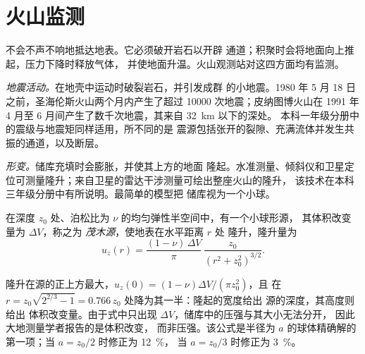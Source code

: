 \section{火山监测}

不会不声不响地抵达地表。它必须破开岩石以开辟
通道；积聚时会将地面向上推起，压力下降时释放气体，
并使地面升温。火山观测站对这四方面均有监测。

\emph{地震活动。}在地壳中运动时破裂岩石，并引发成群
的小地震。1980 年 5 月 18 日之前，圣海伦斯火山两个月内产生了超过
\num{10000} 次地震；皮纳图博火山在 1991 年 4 月至
6 月间产生了数千次地震，其来自 \qty{32}{km} 以下的深处。
本科一年级分册中的震级与地震矩同样适用，所不同的是
震源包括张开的裂隙、充满流体并发生共振的通道，以及断层。

\emph{形变。}储库充填时会膨胀，并使其上方的地面
隆起。水准测量、倾斜仪和卫星定位可测量隆升；来自卫星的雷达干涉测量可绘出整座火山的隆升，
该技术在本科三年级分册中有所说明。最简单的模型把
储库视为一个小球。

\begin{proposition}[茂木源]\label{prop:b2:eruptive-styles:mogi}
在深度 $z_0$ 处、泊松比为 $\nu$ 的均匀弹性半空间中，有一个小球形源，
其体积改变量为 $\Delta V$，称之为
\emph{茂木源}，使地表在水平距离 $r$ 处
隆升，隆升量为
\[
u_z(r) = \frac{(1 - \nu)\,\Delta V}{\pi}\,\frac{z_0}{(r^2 + z_0^2)^{3/2}} .
\]
\end{proposition}
\admitted

隆升在源的正上方最大，$u_z(0) = (1 - \nu)\Delta V/(\pi z_0^2)$，且
在 $r = z_0\sqrt{2^{2/3} - 1} = 0.766\,z_0$ 处降为其一半：隆起的宽度给出
源的深度，其高度则给出
体积改变量。由于式中只出现 $\Delta V$，储库中的压强与其大小无法分开，
因此大地测量学者报告的是体积改变，
而非压强。该公式是半径为
$a$ 的球体精确解的第一项；当 $a = z_0/2$ 时修正为 \qty{12}{\percent}，
当 $a = z_0/3$ 时修正为 \qty{3}{\percent}。

